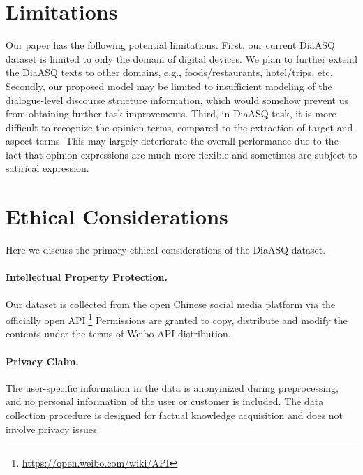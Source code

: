 \documentclass[11pt]{article}
\begin{document}
\section*{Limitations}
Our paper has the following potential limitations.
First, our current DiaASQ dataset is limited to only the domain of digital devices.
We plan to further extend the DiaASQ texts to other domains, e.g., foods/restaurants, hotel/trips, etc.
Secondly, our proposed model may be limited to insufficient modeling of the dialogue-level discourse structure information, which would somehow prevent us from obtaining further task improvements.
Third, in DiaASQ task, it is more difficult to recognize the opinion terms, compared to the extraction of target and aspect terms.
This may largely deteriorate the overall performance due to the fact that opinion expressions are much more flexible and sometimes are subject to satirical expression.

\section*{Ethical Considerations}
Here we discuss the primary ethical considerations of the DiaASQ dataset.

\vspace{-4pt}
\paragraph{Intellectual Property Protection.}
Our dataset is collected from the open Chinese social media platform via the officially open API.\footnote{\url{https://open.weibo.com/wiki/API}}
Permissions are granted to copy, distribute and modify the contents under the terms of Weibo API distribution.

\vspace{-4pt}
\paragraph{Privacy Claim.}
The user-specific information in the data is anonymized during preprocessing, and no personal information of the user or customer is included.
The data collection procedure is designed for factual knowledge acquisition and does not involve privacy issues.

\vspace{-4pt}
\end{document}
